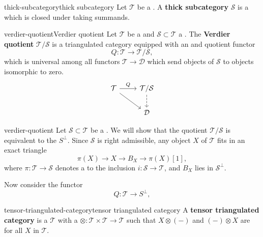 \begin{topic}{thick-subcategory}{thick subcategory}
    Let $\mathcal{T}$ be a . A \textbf{thick subcategory} $\mathcal{S}$ is a   which is closed under taking summands.
\end{topic}

\begin{topic}{verdier-quotient}{Verdier quotient}
    Let $\mathcal{T}$ be a  and $\mathcal{S} \subset \mathcal{T}$ a . The \textbf{Verdier quotient} $\mathcal{T}/\mathcal{S}$ is a triangulated category equipped with an  and  quotient functor
    \[ Q : \mathcal{T} \to \mathcal{T}/\mathcal{S} , \]
    which is universal among all functors $\mathcal{T} \to \mathcal{D}$ which send objects of $\mathcal{S}$ to objects isomorphic to zero.
    \[ \begin{tikzcd} \mathcal{T} \arrow{r}{Q} \arrow{rd} & \mathcal{T} / \mathcal{S} \arrow[dashed]{d} \\ & \mathcal{D} \end{tikzcd} \]
\end{topic}

\begin{example}{verdier-quotient}
    Let $\mathcal{S} \subset \mathcal{T}$ be a . We will show that the quotient $\mathcal{T}/\mathcal{S}$ is equivalent to the  $S^\perp$. Since $\mathcal{S}$ is right admissible, any object $X$ of $\mathcal{T}$ fits in an exact triangle
    \[ \pi(X) \to X \to B_X \to \pi(X)[1] , \]
    where $\pi : \mathcal{T} \to \mathcal{S}$ denotes a  to the inclusion $i : \mathcal{S} \to \mathcal{T}$, and $B_X$ lies in $\mathcal{S}^\perp$.
    
    Now consider the functor
    \[ Q : \mathcal{T} \to S^\perp , \]
\end{example}

\begin{topic}{tensor-triangulated-category}{tensor triangulated category}
    A \textbf{tensor triangulated category} is a  $\mathcal{T}$ with a  $\otimes : \mathcal{T} \times \mathcal{T} \to \mathcal{T}$ such that $X \otimes (-)$ and $(-) \otimes X$ are  for all $X$ in $\mathcal{T}$.
\end{topic}

